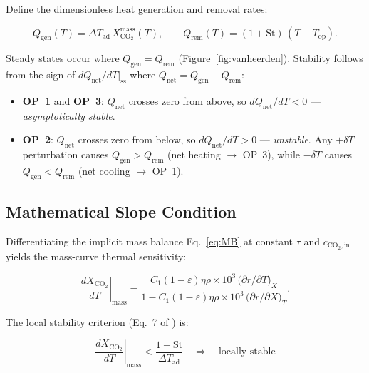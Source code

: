 \documentclass[11pt,a4paper]{article}
\newcommand{\dTad}{\Delta T_{\mathrm{ad}}}
\newcommand{\Xco}{X_{\mathrm{CO_2}}}
\newcommand{\Top}{T_{\mathrm{op}}}
\newcommand{\St}{\mathrm{St}}
\newcommand{\eps}{\varepsilon}
\newcommand{\cin}{c_{\mathrm{CO_2,in}}}
\begin{document}
Define the dimensionless heat generation and removal rates:

\begin{equation}
  Q_{\mathrm{gen}}(T) = \dTad\,\Xco^{\mathrm{mass}}(T),
  \qquad
  Q_{\mathrm{rem}}(T) = (1+\St)\,(T - \Top).
\end{equation}

Steady states occur where $Q_{\mathrm{gen}} = Q_{\mathrm{rem}}$
(Figure~\ref{fig:vanheerden}).  Stability follows from the sign of
$dQ_{\mathrm{net}}/dT\big|_\mathrm{ss}$ where
$Q_{\mathrm{net}} = Q_{\mathrm{gen}} - Q_{\mathrm{rem}}$:

\begin{itemize}[itemsep=1pt,leftmargin=1.6em]
  \item \textbf{OP~1} and \textbf{OP~3}: $Q_{\mathrm{net}}$ crosses zero from above,
        so $dQ_{\mathrm{net}}/dT < 0$ — \textit{asymptotically stable}.
  \item \textbf{OP~2}: $Q_{\mathrm{net}}$ crosses zero from below,
        so $dQ_{\mathrm{net}}/dT > 0$ — \textit{unstable}. Any $+\delta T$ perturbation
        causes $Q_{\mathrm{gen}} > Q_{\mathrm{rem}}$ (net heating $\to$ OP~3), while
        $-\delta T$ causes $Q_{\mathrm{gen}} < Q_{\mathrm{rem}}$ (net cooling $\to$ OP~1).
\end{itemize}

\subsection{Mathematical Slope Condition}
\label{sec:slope}

Differentiating the implicit mass balance Eq.~\eqref{eq:MB} at constant
$\tau$ and $\cin$ yields the mass-curve thermal sensitivity:

\begin{equation}
  \left.\frac{d\Xco}{dT}\right|_{\text{mass}} =
  \frac{C_1(1-\eps)\eta\rho\times10^3\,
        \bigl(\partial r/\partial T\bigr)_{X}}
       {1 - C_1(1-\eps)\eta\rho\times10^3\,
        \bigl(\partial r/\partial X\bigr)_{T}}.
  \label{eq:dXdT}
\end{equation}

The local stability criterion (Eq.~7 of \cite{bremer2021}) is:

\begin{equation}
  \boxed{
  \left.\frac{d\Xco}{dT}\right|_{\text{mass}} < \frac{1+\St}{\dTad}
  \quad \Longrightarrow \quad \text{locally stable}}
  \label{eq:stability}
\end{equation}
\end{document}
